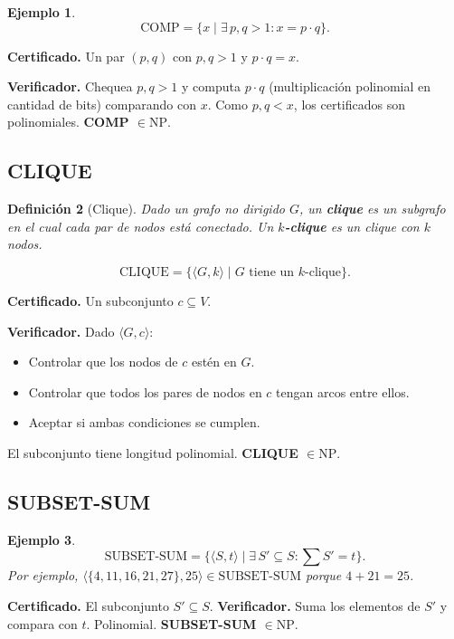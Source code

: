 \documentclass[11pt,a4paper]{article}
\theoremstyle{definicion}
\newtheorem{definicion}{Definici\'on}[section]
\newtheorem{ejemplo}[definicion]{Ejemplo}
\newcommand{\enc}[1]{\langle #1 \rangle}
\newcommand{\NP}{\mathrm{NP}}
\begin{document}
\begin{ejemplo}
\[
\mathrm{COMP} = \{ x \mid \exists\, p, q > 1 : x = p \cdot q\}.
\]
\end{ejemplo}

\textbf{Certificado.} Un par $(p, q)$ con $p, q > 1$ y $p \cdot q = x$.

\textbf{Verificador.} Chequea $p, q > 1$ y computa $p \cdot q$ (multiplicaci\'on polinomial en cantidad de bits) comparando con $x$. Como $p, q < x$, los certificados son polinomiales. \textbf{COMP $\in \NP$}.

\subsection{CLIQUE}

\begin{definicion}[Clique]
Dado un grafo no dirigido $G$, un \textbf{clique} es un subgrafo en el cual cada par de nodos est\'a conectado. Un \textbf{$k$-clique} es un clique con $k$ nodos.
\end{definicion}

\[
\mathrm{CLIQUE} = \{ \enc{G, k} \mid G \text{ tiene un } k\text{-clique}\}.
\]

\textbf{Certificado.} Un subconjunto $c \subseteq V$.

\textbf{Verificador.} Dado $\enc{G, c}$:
\begin{itemize}
    \item Controlar que los nodos de $c$ est\'en en $G$.
    \item Controlar que todos los pares de nodos en $c$ tengan arcos entre ellos.
    \item Aceptar si ambas condiciones se cumplen.
\end{itemize}

El subconjunto tiene longitud polinomial. \textbf{CLIQUE $\in \NP$}.

\subsection{SUBSET-SUM}

\begin{ejemplo}
\[
\mathrm{SUBSET\text{-}SUM} = \{ \enc{S, t} \mid \exists\, S' \subseteq S : \textstyle\sum S' = t\}.
\]
Por ejemplo, $\enc{\{4, 11, 16, 21, 27\}, 25} \in \mathrm{SUBSET\text{-}SUM}$ porque $4 + 21 = 25$.
\end{ejemplo}

\textbf{Certificado.} El subconjunto $S' \subseteq S$.
\textbf{Verificador.} Suma los elementos de $S'$ y compara con $t$. Polinomial. \textbf{SUBSET-SUM $\in \NP$}.
\end{document}
